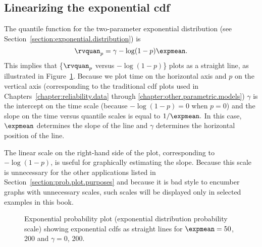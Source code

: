 \subsection{Linearizing the exponential cdf}
\label{section:linearizing.exponential.probplot}
The quantile function for the  two-parameter
exponential distribution 
(see Section~\ref{section:exponential.distribution}) is
\begin{displaymath}
\rvquan_{p}= \gamma - \log(1-p) \expmean. 
\end{displaymath}
This
implies that \{$\rvquan_{p}$ versus $-\log(1-p)$\} plots as a
straight line, as illustrated in Figure~\ref{figure:linear.exponential.ps}.
Because we plot time on the horizontal
axis and $p$ on the
vertical axis (corresponding to the traditional cdf plots used in
Chapters~\ref{chapter:reliability.data} through
\ref{chapter:other.parametric.models}) $\gamma$ is the intercept on
the time scale (because $-\log(1-p)=0$ when $p=0$) and the slope 
on the time versus quantile scales is
equal to $1/\expmean.$ In this case, $\expmean$ determines the
slope of the line and $\gamma$ determines the horizontal position of the
line. 

The linear scale on the right-hand side of the plot,
corresponding to $-\log(1-p)$, is useful for graphically estimating
the slope. Because this scale is unnecessary for the other 
applications listed in Section~\ref{section:prob.plot.purposes}
and because it is bad style
to encumber graphs with unnecessary scales, such scales will be
displayed only in selected examples in this book.
\begin{figure}
\caption{Exponential probability plot (exponential distribution probability 
scale) showing exponential cdfs as straight lines for
$\expmean=50$, 200 and $\gamma=0$, 200.}
\label{figure:linear.exponential.ps}
\end{figure}



